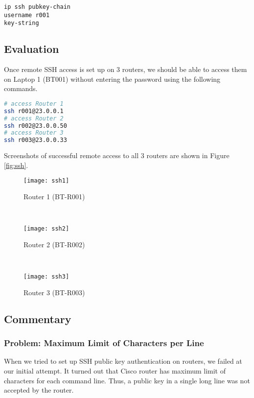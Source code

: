 \begin{lstlisting}
ip ssh pubkey-chain
username r001
key-string
\end{lstlisting}

\subsection{Evaluation}

Once remote SSH access is set up on 3 routers, we should be able to access them on Laptop 1 (BT001) without entering the password using the following commands.

\begin{lstlisting}[language=sh]
# access Router 1
ssh r001@23.0.0.1 
# access Router 2
ssh r002@23.0.0.50
# access Router 3
ssh r003@23.0.0.33
\end{lstlisting}

Screenshots of successful remote access to all 3 routers are shown in Figure \ref{fig:ssh}.

\begin{figure*}[t!]
    \centering
    \begin{subfigure}[t]{0.3\textwidth}
        \centering
        \texttt{[image: ssh1]}
        \caption{Router 1 (BT-R001)}
    \end{subfigure}
    ~ 
    \begin{subfigure}[t]{0.3\textwidth}
        \centering
        \texttt{[image: ssh2]}
        \caption{Router 2 (BT-R002)}
    \end{subfigure}
    ~ 
    \begin{subfigure}[t]{0.3\textwidth}
        \centering
        \texttt{[image: ssh3]}
        \caption{Router 3 (BT-R003)}
    \end{subfigure}
    \caption{Sucessful remote SSH access to all 3 routers from Laptop 1 (BT001).}
    \label{fig:ssh}
\end{figure*}


\subsection{Commentary}

\subsubsection{Problem: Maximum Limit of Characters per Line}

When we tried to set up SSH public key authentication on routers, we failed at our initial attempt. It turned out that Cisco router has maximum limit of characters for each command line. Thus, a public key in a single long line was not accepted by the router. 

